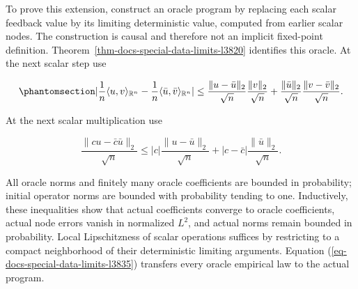 \documentclass[
  11pt,
]{article}
\theoremstyle{definition}
\theoremstyle{plain}
\theoremstyle{plain}
\theoremstyle{plain}
\theoremstyle{remark}
\begin{document}
To prove this extension, construct an oracle program by replacing each
scalar feedback value by its limiting deterministic value, computed from
earlier scalar nodes. The construction is causal and therefore not an
implicit fixed-point definition.
Theorem~\ref{thm-docs-special-data-limits-l3820} identifies this oracle.
At the next scalar step use

\begin{equation}\protect\phantomsection\label{eq-docs-special-data-limits-l4059}{
|\frac{1}{n}\langle u,v\rangle_{\mathbb R^n}-\frac{1}{n}\langle\bar u,\bar v\rangle_{\mathbb R^n}|
\le\frac{\|u-\bar u\|_2}{\sqrt n}\frac{\|v\|_2}{\sqrt n}
 +\frac{\|\bar u\|_2}{\sqrt n}\frac{\|v-\bar v\|_2}{\sqrt n}.
}\end{equation}

At the next scalar multiplication use

\[
\frac{\|c u-\bar c\bar u\|_2}{\sqrt n}
\le |c|\frac{\|u-\bar u\|_2}{\sqrt n}+|c-\bar c|\frac{\|\bar u\|_2}{\sqrt n}.
\]

All oracle norms and finitely many oracle coefficients are bounded in
probability; initial operator norms are bounded with probability tending
to one. Inductively, these inequalities show that actual coefficients
converge to oracle coefficients, actual node errors vanish in normalized
\(L^2\), and actual norms remain bounded in probability. Local
Lipschitzness of scalar operations suffices by restricting to a compact
neighborhood of their deterministic limiting arguments. Equation
(\ref{eq-docs-special-data-limits-l3835}) transfers every oracle
empirical law to the actual program.



\end{document}
